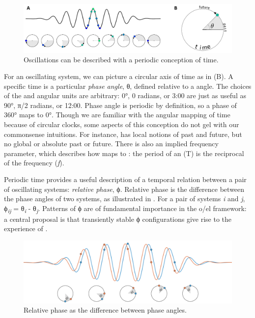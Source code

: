   
\begin{figure}
\includegraphics[width=\textwidth]{figures/Tilsen-img2.png}
\caption{Oscillations can be described with a periodic conception of time.}
\label{fig:1:2}
\end{figure}
 

  For an oscillating system, we can picture a circular axis of time as in {}(B). A specific time is a particular \textit{phase angle}, θ, defined relative to a  angle. The choices of the  and angular units are arbitrary: 0°, 0 radians, or 3:00 are just as useful as 90°, π/2 radians, or 12:00. Phase angle is periodic by definition, so a phase of 360° maps to 0°. Though we are familiar with the angular mapping of time because of circular clocks, some aspects of this conception do not gel with our commonsense intuitions. For instance,  has local notions of past and future, but no global or absolute past or future. There is also an implied frequency parameter, which describes how  maps to : the period of an  (T) is the reciprocal of the frequency (\textit{f}).

  Periodic time provides a useful description of a temporal relation between a pair of oscillating systems: \textit{relative phase}, ϕ. Relative phase is the difference between the phase angles of two systems, as illustrated in {}. For a pair of systems \textit{i} and \textit{j}, ϕ\textit{\textsubscript{ij}}\textsubscript{} = θ\textit{\textsubscript{i}} - θ\textit{\textsubscript{j}}. Patterns of ϕ are of fundamental importance in the o/el framework: a central proposal is that transiently stable ϕ configurations give rise to the experience of .  

  
\begin{figure}
\includegraphics[width=\textwidth]{figures/Tilsen-img3.png}
\caption{Relative phase as the difference between phase angles.}
\label{fig:1:3}
\end{figure}
 

